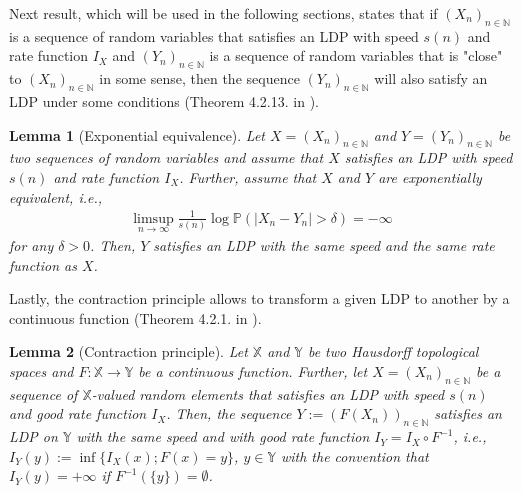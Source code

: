\documentclass[10pt]{amsart}
\newtheorem{lemma}{Lemma}[section]
\newcounter{theor}
\def\N{\mathbb{N}}
\numberwithin{equation}{section}
\begin{document}
Next result, which will be used in the following sections, states that if $(X_n)_{n \in \N}$ is a sequence of random variables that satisfies an LDP with speed $s(n)$ and rate function $I_X$ and $(Y_n)_{n \in \N}$ is a sequence of random variables that is "close" to $(X_n)_{n \in \N}$ in some sense, then the sequence $(Y_n)_{n \in \N}$ will also satisfy an LDP under some conditions (Theorem 4.2.13. in \cite{DZ}).
\begin{lemma}[Exponential equivalence]
\label{LemExponentialEquivalence}
Let $X = (X_n)_{n \in \N}$ and $Y = (Y_n)_{n \in \N}$ be two sequences of random variables and assume that $X$ satisfies an LDP with speed $s(n)$ and rate function $I_X$. Further, assume that $X$ and $Y$ are exponentially equivalent, i.e., 
\begin{align*}
\limsup _{n \to \infty} \frac{1}{s(n)} \log \mathbb{P} ( | X_n - Y_n | > \delta ) = - \infty
\end{align*}
for any $\delta >0$. Then, $Y$ satisfies an LDP with the same speed and the same rate function as $X$.
\end{lemma}

Lastly, the contraction principle allows to transform a given LDP to another by a continuous function (Theorem 4.2.1. in \cite{DZ}). 
\begin{lemma}[Contraction principle]
\label{LemContractionPrinciple}
Let $\mathbb{X}$ and $\mathbb{Y}$ be two Hausdorff topological spaces and $F: \mathbb{X} \to \mathbb{Y}$ be a continuous function. Further, let $X = (X_n)_{n \in \N}$ be a sequence of $\mathbb{X}$-valued random elements that satisfies an LDP with speed $s(n)$ and good rate function $I_X$. Then, the sequence $Y:=  ( F(X_n) )_{n \in \N}$ satisfies an LDP on $\mathbb{Y}$ with the same speed and with good rate function $I_Y = I_X \circ F^{-1}$, i.e., $I_Y(y) := \inf \lbrace I_X(x) ; F(x) = y \rbrace$, $y \in \mathbb{Y}$ with the convention that $I_Y(y) = +\infty$ if $F^{-1} ( \lbrace y \rbrace ) = \emptyset$. 
\end{lemma}



\end{document}

